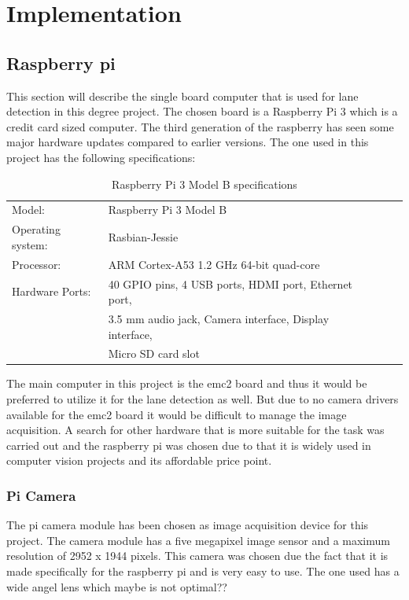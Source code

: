 \chapter{Implementation}


\section{Raspberry pi}
This section will describe the single board computer that is used for lane detection in this degree project. The chosen board is a Raspberry Pi 3 which is a credit card sized computer. The third generation of the raspberry has seen some major hardware updates compared to earlier versions. The one used in this project has the following specifications:



\begin{table}[H]
\centering
\caption{Raspberry Pi 3 Model B specifications}
\label{my-label}
\begin{tabular}{lllll}
 Model:	&Raspberry Pi 3 Model B  \\
 Operating system:	&Rasbian-Jessie  \\
 Processor:	&ARM Cortex-A53 1.2 GHz 64-bit quad-core  \\
 Hardware Ports:	&40 GPIO pins, 4 USB ports, HDMI port, Ethernet port,\\  &3.5 mm audio jack, Camera interface, Display interface,\\  &Micro SD card slot
\end{tabular}
\end{table}



The main computer in this project is the emc2 board and thus it would be preferred to utilize it for the lane detection as well. But due to no camera drivers available for the emc2 board it would be difficult to manage the image acquisition. A search for other hardware that is more suitable for the task was carried out and the raspberry pi was chosen due to that it is widely used in computer vision projects and its affordable price point.

\subsection{Pi Camera}
The pi camera module has been chosen as image acquisition device for this project. The camera module has a five megapixel image sensor and a maximum resolution of 2952 x 1944 pixels. This camera was chosen due the fact that it is made specifically for the raspberry pi and is very easy to use. The one used has a wide angel lens which maybe is not optimal??






